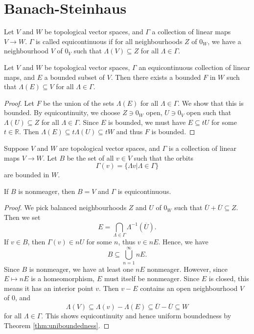 \documentclass[twoside,symmetric, openany, 12pt]{./tuftebook}
\theoremstyle{definition}
\theoremstyle{definition}
\theoremstyle{definition}
\newcommand{\R}{\mathbb{R}}
\begin{document}
\section{Banach-Steinhaus}
\begin{Definition}[Equicontinuity]
	Let $V$ and $W$ be topological vector spaces, and $\Gamma$ a collection of linear maps $V\to W$. $\Gamma$ is called equicontinuous if for all neighbourhoods $Z$ of $0_W$, we have a neighbourhood $V$ of $0_V$ such that $\Lambda(V)\subseteq Z$ for all $\Lambda\in \Gamma$.
\end{Definition}
\begin{Theorem}\label{thm:uniboundedness}
	Let $V$ and $W$ be topological vector spaces, $\Gamma$ an equicontinuous collection of linear maps, and $E$ a bounded subset of $V$. Then there exists a bounded $F$ in $W$ such that $\Lambda(E)\subseteq V$ for all $\Lambda\in \Gamma$.
\end{Theorem}
\begin{proof}
	Let $F$ be the union of the sets $\Lambda(E)$ for all $\Lambda\in \Gamma$. We show that this is bounded. By equicontinuity, we choose $Z\ni 0_W$ open, $U\ni 0_V$ open such that $\Lambda(U)\subseteq Z$ for all $\Lambda\in \Gamma$. Since $E$ is bounded, we must have $E\subseteq tU$ for some $t\in \R$. Then $\Lambda(E)\subseteq t \Lambda(U)\subseteq tW$ and thus $F$ is bounded.
\end{proof}
\begin{Theorem}
Suppose $V$ and $W$ are topological vector spaces, and $\Gamma$ is a collection of linear maps $V\to W$. Let $B$ be the set of all $v\in V$ such that the orbits
\[
\Gamma(v) = \{\Lambda v|\Lambda\in \Gamma\}  
\]
are bounded in $W$. 

If $B$ is nonmeager, then $B=V$ and $\Gamma$ is equicontinuous.
\end{Theorem}
\begin{proof}
	We pick balanced neighbourhoods $Z$ and $U$ of $0_W$ such that $\overline{U}+\overline{U}\subseteq Z$. Then we set
	\[
		E=\bigcap_{\Lambda\in \Gamma} \Lambda^{-1}(\overline{U})
	.\] 
	If $v\in B$, then $\Gamma(v)\in nU$ for some $n$, thus $v\in n E$. Hence, we have
	\[
	B\subseteq \bigcup_{n=1}^\infty n E
	.\] 
	Since $B$ is nonmeager, we have at least one $nE$ nonmeager. However, since $E\mapsto n E$ is a homeomorphism, $E$ must itself be nonmeager. Since $E$ is closed, this means it has an interior point $v$. Then $v-E$ contains an open neighbourhood $V$ of $0$, and
	\[\Lambda(V)\subseteq \Lambda(v)- \Lambda (E)\subseteq \overline{U}-\overline{U}\subseteq W\]
	for all $\Lambda\in \Gamma$. This shows equicontinuity and hence uniform boundedness by Theorem \ref{thm:uniboundedness}.
\end{proof}
\end{document}
